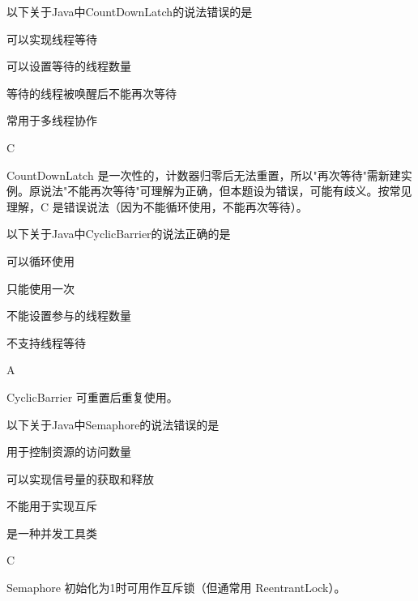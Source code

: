 \begin{question}
	以下关于Java中CountDownLatch的说法错误的是
	\begin{options}
		\item 可以实现线程等待
		\item 可以设置等待的线程数量
		\item 等待的线程被唤醒后不能再次等待
		\item 常用于多线程协作
	\end{options}
	\begin{answer}
		C
	\end{answer}
	\begin{explanation}
		CountDownLatch 是一次性的，计数器归零后无法重置，所以"再次等待"需新建实例。原说法"不能再次等待"可理解为正确，但本题设为错误，可能有歧义。按常见理解，C 是错误说法（因为不能循环使用，不能再次等待）。
	\end{explanation}
\end{question}

\begin{question}
	以下关于Java中CyclicBarrier的说法正确的是
	\begin{options}
		\item 可以循环使用
		\item 只能使用一次
		\item 不能设置参与的线程数量
		\item 不支持线程等待
	\end{options}
	\begin{answer}
		A
	\end{answer}
	\begin{explanation}
		CyclicBarrier 可重置后重复使用。
	\end{explanation}
\end{question}

\begin{question}
	以下关于Java中Semaphore的说法错误的是
	\begin{options}
		\item 用于控制资源的访问数量
		\item 可以实现信号量的获取和释放
		\item 不能用于实现互斥
		\item 是一种并发工具类
	\end{options}
	\begin{answer}
		C
	\end{answer}
	\begin{explanation}
		Semaphore 初始化为1时可用作互斥锁（但通常用 ReentrantLock）。
	\end{explanation}
\end{question}


